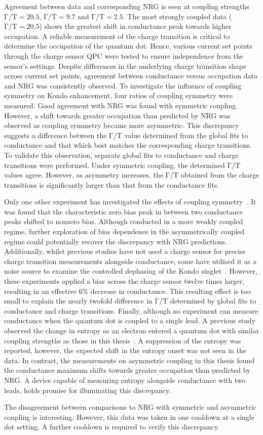 Agreement between data and corresponding NRG is seen at coupling strengths $\mathrm{\Gamma/T} = 20.5$, $\mathrm{\Gamma/T} = 9.7$ and $\mathrm{\Gamma/T} = 2.5$. The most strongly coupled data ($\mathrm{\Gamma/T} = 20.5$) shows the greatest shift in conductance peak towards higher occupation. 
A reliable measurement of the charge transition is critical to determine the occupation of the quantum dot. 
Hence, various current set points through the charge sensor QPC were tested to ensure independence from the sensor's settings.
Despite differences in the underlying charge transition shape across current set points, agreement between conductance versus occupation data and NRG was consistently observed.
To investigate the influence of coupling symmetry on Kondo enhancement, four ratios of coupling symmetry were measured.
Good agreement with NRG was found with symmetric coupling. 
However, a shift towards greater occupation than predicted by NRG was observed as coupling symmetry became more asymmetric.
This discrepancy suggests a difference between the $\mathrm{\Gamma/T}$ value determined from the global fits to conductance and that which best matches the corresponding charge transitions. 
To validate this observation, separate global fits to conductance and charge transitions were performed. Under symmetric coupling, the determined $\mathrm{\Gamma/T}$ values agree. However, as asymmetry increases, the $\mathrm{\Gamma/T}$ obtained from the charge transitions is significantly larger than that from the conductance fits.

Only one other experiment has investigated the effects of coupling symmetry~\cite{kondo_asymmetric}. 
It was found that the characteristic zero bias peak in between two conductance peaks shifted to nonzero bias. 
Although conducted in a more weakly coupled regime, further exploration of bias dependence in the asymmetrically coupled regime could potentially recover the discrepancy with NRG predictions. 
Additionally, whilst previous studies have not used a charge sensor for precise charge transition measurements alongside conductance, some have utilised it as a noise source to examine the controlled dephasing of the Kondo singlet~\cite{kondo_controlled_dephasing}. 
However, these experiments applied a bias across the charge sensor twelve times larger, resulting in an effective $6\%$ decrease in conductance. 
This resulting effect is too small to explain the nearly twofold difference in $\mathrm{\Gamma/T}$ determined by global fits to conductance and charge transitions.
Finally, although no experiment can measure conductance when the quantum dot is coupled to a single lead. 
A previous study observed the change in entropy as an electron entered a quantum dot with similar coupling strengths as those in this thesis~\cite{child_strong}. 
A suppression of the entropy was reported, however, the expected shift in the  entropy onset was not seen in the data. 
In contrast, the measurements on asymmetric coupling in this thesis found the conductance maximum shifts towards greater occupation than predicted by NRG.
A device capable of measuring entropy alongside conductance with two leads, holds promise for illuminating this discrepancy.


The disagreement between comparisons to NRG with symmetric and asymmetric coupling is interesting. However, this data was taken in one cooldown at a single dot setting. A further cooldown is required to verify this discrepancy.